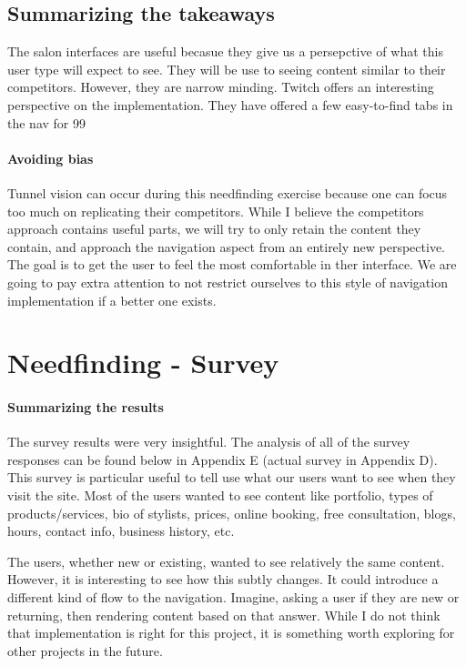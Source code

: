\subsection{Summarizing the takeaways}
The salon interfaces are useful becasue they give us a persepctive of what this user type will expect to see. They will be use to seeing content similar to their competitors. However, they are narrow minding. Twitch offers an interesting perspective on the implementation. They have offered a few easy-to-find tabs in the nav for 99%

\paragraph{Avoiding bias}
Tunnel vision can occur during this needfinding exercise because one can focus too much on replicating their competitors. While I believe the competitors approach contains useful parts, we will try to only retain the content they contain, and approach the navigation aspect from an entirely new perspective. The goal is to get the user to feel the most comfortable in ther interface. We are going to pay extra attention to not restrict ourselves to this style of navigation implementation if a better one exists.


\section{Needfinding - Survey}

\paragraph{Summarizing the results}
The survey results were very insightful. The analysis of all of the survey responses can be found below in Appendix E (actual survey in Appendix D). This survey is particular useful to tell use what our users want to see when they visit the site. Most of the users wanted to see content like portfolio, types of products/services, bio of stylists, prices, online booking, free consultation, blogs, hours, contact info, business history, etc.

The users, whether new or existing, wanted to see relatively the same content. However, it is interesting to see how this subtly changes. It could introduce a different kind of flow to the navigation. Imagine, asking a user if they are new or returning, then rendering content based on that answer. While I do not think that implementation is right for this project, it is something worth exploring for other projects in the future.

